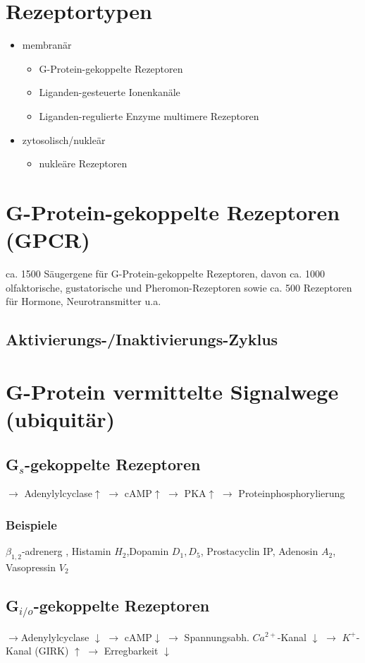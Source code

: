 \documentclass[10pt,a4paper]{report}
\begin{document}
\section{Rezeptortypen}
\begin{itemize}
	\item membranär
	\begin{itemize}
		\item G-Protein-gekoppelte Rezeptoren
		\item Liganden-gesteuerte Ionenkanäle
		\item Liganden-regulierte Enzyme
			multimere Rezeptoren 
	\end{itemize}
	\item zytosolisch/nukleär
	\begin{itemize}
		\item nukleäre Rezeptoren
	\end{itemize}
\end{itemize}
\section{G-Protein-gekoppelte Rezeptoren (GPCR)}
ca. 1500 Säugergene für G-Protein-gekoppelte Rezeptoren, davon ca. 1000 olfaktorische, gustatorische und Pheromon-Rezeptoren sowie ca. 500 Rezeptoren für Hormone, Neurotransmitter u.a.
\subsection{Aktivierungs-/Inaktivierungs-Zyklus}
\section{G-Protein vermittelte Signalwege (ubiquitär)}
\subsection{G$_s$-gekoppelte Rezeptoren}
$\rightarrow$ Adenylylcyclase$\uparrow$ $\rightarrow$ cAMP$\uparrow$ $\rightarrow$ PKA$\uparrow$ $\rightarrow$ Proteinphosphorylierung
\subsubsection{Beispiele}
$\beta_{1,2}$-adrenerg	, Histamin $H_2$,Dopamin $D_1,D_5$, Prostacyclin IP, Adenosin $A_2$, Vasopressin $V_2$
\subsection{G$_{i/o}$-gekoppelte Rezeptoren}
$\rightarrow$Adenylylcyclase $\downarrow$ $\rightarrow$ cAMP$\downarrow$
$\rightarrow$ Spannungsabh. $Ca^{2+}$-Kanal $\downarrow$ 
$\rightarrow$ $K^+$-Kanal (GIRK) $\uparrow$
$\rightarrow$ Erregbarkeit $\downarrow$
\end{document}
